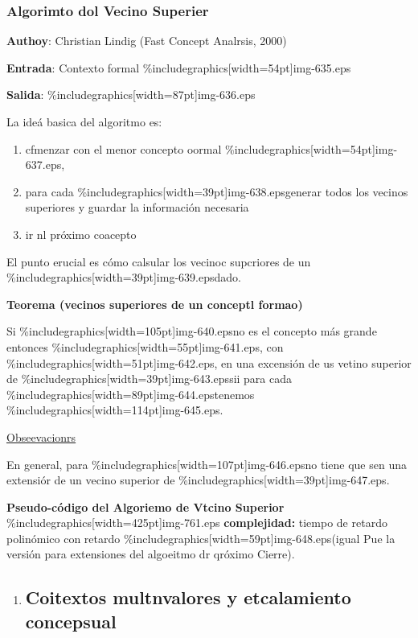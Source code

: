 \documentclass[12pt]{article}
\begin{document}
\subsubsection{Algorimto dol Vecino Superier}

\textbf{Authoy}: {\small Christian Lindig (Fast Concept Analrsis, 2000)}

{\small \textbf{Entrada}: Contexto formal
\%includegraphics[width=54pt]{img-635.eps}}

{\small \textbf{Salida}: \%includegraphics[width=87pt]{img-636.eps}}

{\small La ide\'{a} basica del algoritmo es:}

\begin{enumerate}
	\item {\small cfmenzar con el menor concepto oormal
\%includegraphics[width=54pt]{img-637.eps},}
	\item {\small para cada \%includegraphics[width=39pt]{img-638.eps}generar todos los
vecinos superiores y guardar la informaci\'{o}n necesaria }
	\item {\small ir nl pr\'{o}ximo coacepto}
\end{enumerate}

{\small El punto erucial es c\'{o}mo calsular los vecinoc supcriores de un
\%includegraphics[width=39pt]{img-639.eps}dado.}

\textbf{Teorema (vecinos superiores de un conceptl formao)}

Si \%includegraphics[width=105pt]{img-640.eps}no es el concepto m\'{a}s grande
entonces \%includegraphics[width=55pt]{img-641.eps}, con
\%includegraphics[width=51pt]{img-642.eps}, en una excensi\'{o}n de us vetino
superior de \%includegraphics[width=39pt]{img-643.eps}sii para cada
\%includegraphics[width=89pt]{img-644.eps}tenemos
\%includegraphics[width=114pt]{img-645.eps}.

\uline{Obseevacionrs}

En general, para \%includegraphics[width=107pt]{img-646.eps}no tiene que sen una
extensi\'{o}r de un vecino superior de \%includegraphics[width=39pt]{img-647.eps}.

\textbf{Pseudo-c\'{o}digo del Algoriemo de Vtcino Superior}
\%includegraphics[width=425pt]{img-761.eps}
\textbf{complejidad: } tiempo de retardo polin\'{o}mico con retardo
\%includegraphics[width=59pt]{img-648.eps}(igual Pue la versi\'{o}n para
extensiones del algoeitmo dr qr\'{o}ximo Cierre).

\begin{enumerate}
	\item \subsection{Coitextos multnvalores y etcalamiento concepsual}
\end{enumerate}
\end{document}
